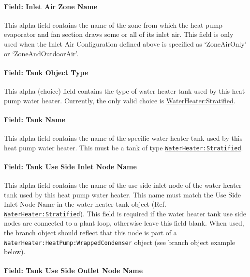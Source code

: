 \paragraph{Field: Inlet Air Zone Name}\label{field-inlet-air-zone-name-1}

This alpha field contains the name of the zone from which the heat pump evaporator and fan section draws some or all of its inlet air. This field is only used when the Inlet Air Configuration defined above is specified as `ZoneAirOnly' or `ZoneAndOutdoorAir'.

\paragraph{Field: Tank Object Type}\label{field-tank-object-type-1}

This alpha (choice) field contains the type of water heater tank used by this heat pump water heater. Currently, the only valid choice is \hyperref[waterheaterstratified]{WaterHeater:Stratified}.

\paragraph{Field: Tank Name}\label{field-tank-name-1}

This alpha field contains the name of the specific water heater tank used by this heat pump water heater. This must be a tank of type \hyperref[waterheaterstratified]{\lstinline!WaterHeater:Stratified!}.

\paragraph{Field: Tank Use Side Inlet Node Name}\label{field-tank-use-side-inlet-node-name-1}

This alpha field contains the name of the use side inlet node of the water heater tank used by this heat pump water heater. This name must match the Use Side Inlet Node Name in the water heater tank object (Ref. \hyperref[waterheaterstratified]{\lstinline!WaterHeater:Stratified!}). This field is required if the water heater tank use side nodes are connected to a plant loop, otherwise leave this field blank. When used, the branch object should reflect that this node is part of a \lstinline!WaterHeater:HeatPump:WrappedCondenser! object (see branch object example below).

\paragraph{Field: Tank Use Side Outlet Node Name}\label{field-tank-use-side-outlet-node-name-1}

